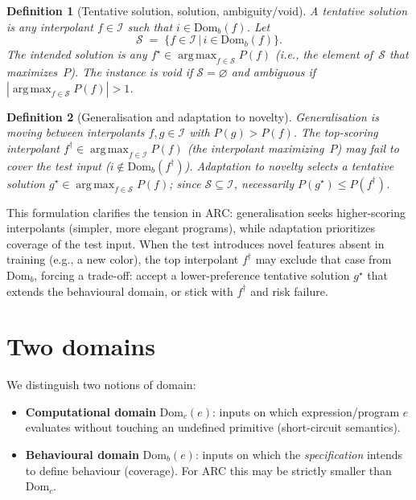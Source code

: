 \documentclass[11pt]{article}
\newtheorem{definition}{Definition}
\newcommand{\Domc}{\mathrm{Dom}_c}
\newcommand{\Domb}{\mathrm{Dom}_b}
\DeclareMathOperator*{\argmax}{arg\,max}
\begin{document}
\begin{definition}[Tentative solution, solution, ambiguity/void]
A \emph{tentative solution} is any interpolant $f\in\mathcal{I}$ such that $i\in\Domb(f)$. Let
\[
\mathcal{S} \;=\; \bigl\{ f\in\mathcal{I} \,\big|\, i\in\Domb(f)\bigr\}.
\]
The \emph{intended solution} is any $f^\star\in \argmax_{f\in\mathcal{S}} P(f)$ (i.e., the element of~$\mathcal{S}$ that maximizes~$P$). The instance is \emph{void} if $\mathcal{S}=\varnothing$ and \emph{ambiguous} if $|\argmax_{f\in\mathcal{S}} P(f)|>1$.
\end{definition}

\begin{definition}[Generalisation and adaptation to novelty]
\emph{Generalisation} is moving between interpolants $f,g\in\mathcal{I}$ with $P(g)>P(f)$. The top-scoring interpolant $f^\dagger\in\argmax_{f\in\mathcal{I}}P(f)$ (the interpolant maximizing~$P$) may fail to cover the test input ($i\notin\Domb(f^\dagger)$). \emph{Adaptation to novelty} selects a tentative solution $g^\star\in\argmax_{f\in\mathcal{S}}P(f)$; since $\mathcal{S}\subseteq\mathcal{I}$, necessarily $P(g^\star)\le P(f^\dagger)$.
\end{definition}

This formulation clarifies the tension in ARC: generalisation seeks higher-scoring interpolants (simpler, more elegant programs), while adaptation prioritizes coverage of the test input. When the test introduces novel features absent in training (e.g., a new color), the top interpolant $f^\dagger$ may exclude that case from $\Domb$, forcing a trade-off: accept a lower-preference tentative solution $g^\star$ that extends the behavioural domain, or stick with $f^\dagger$ and risk failure.

\section{Two domains}

We distinguish two notions of domain:
\begin{itemize}[leftmargin=1.5em]
\item \textbf{Computational domain} $\Domc(e)$: inputs on which expression/program $e$ evaluates without touching an undefined primitive (short-circuit semantics).
\item \textbf{Behavioural domain} $\Domb(e)$: inputs on which the \emph{specification} intends to define behaviour (coverage). For ARC this may be strictly smaller than $\Domc$.
\end{itemize}
\end{document}
